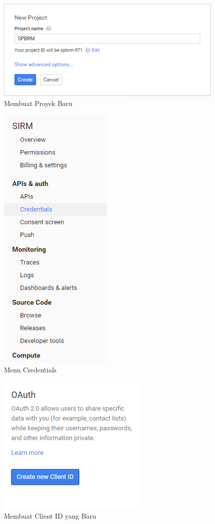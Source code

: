 \begin{figure}[p]
\centering
\includegraphics[scale=0.5]{Gambar/newproject.png}
\caption[Membuat Proyek Baru]{Membuat Proyek Baru} 
\label{fig:newproject}
\end{figure}

\begin{figure}[p]
\centering
\includegraphics[scale=0.5]{Gambar/credentials.png}
\caption[Menu Credentials]{Menu Credentials} 
\label{fig:credentials}
\end{figure}

\begin{figure}[p]
\centering
\includegraphics[scale=0.5]{Gambar/newclientid.png}
\caption[Membuat Client ID yang Baru]{Membuat Client ID yang Baru} 
\label{fig:newclientid}
\end{figure}


